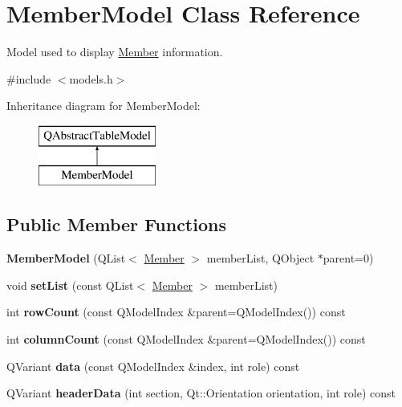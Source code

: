 \hypertarget{class_member_model}{}\section{Member\+Model Class Reference}
\label{class_member_model}


Model used to display \mbox{\hyperlink{class_member}{Member}} information.  




{\ttfamily \#include $<$models.\+h$>$}

Inheritance diagram for Member\+Model\+:\begin{figure}[H]
\begin{center}
\leavevmode
\includegraphics[height=2.000000cm]{class_member_model}
\end{center}
\end{figure}
\subsection*{Public Member Functions}
\begin{DoxyCompactItemize}
\item 
\mbox{\label{class_member_model_a3d6668245c339005f8c1ab1e82e3f8d7}} 
{\bfseries Member\+Model} (Q\+List$<$ \mbox{\hyperlink{class_member}{Member}} $>$ member\+List, Q\+Object $\ast$parent=0)
\item 
\mbox{\label{class_member_model_aa98e364e96a8a2a45bd94480dc68ca20}} 
void {\bfseries set\+List} (const Q\+List$<$ \mbox{\hyperlink{class_member}{Member}} $>$ member\+List)
\item 
\mbox{\label{class_member_model_aaf9130b65bc0e3bde058ad6f5dbdc369}} 
int {\bfseries row\+Count} (const Q\+Model\+Index \&parent=Q\+Model\+Index()) const
\item 
\mbox{\label{class_member_model_a0c7ec2abec9951bb9364d3a58c1aed66}} 
int {\bfseries column\+Count} (const Q\+Model\+Index \&parent=Q\+Model\+Index()) const
\item 
\mbox{\label{class_member_model_ad7546e6283f6c1c00f4780bc723f8b96}} 
Q\+Variant {\bfseries data} (const Q\+Model\+Index \&index, int role) const
\item 
\mbox{\label{class_member_model_aea1d06c087df5f3afcf9bd579b1f4586}} 
Q\+Variant {\bfseries header\+Data} (int section, Qt\+::\+Orientation orientation, int role) const
\end{DoxyCompactItemize}
